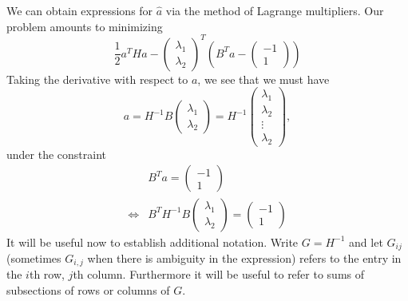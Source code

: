 \documentclass[11pt]{article}
\theoremstyle{definition}
\theoremstyle{remark}
\numberwithin{equation}{section}
\begin{document}
We can obtain expressions for $\hat{a}$ via the method of Lagrange multipliers. Our problem amounts to minimizing 
\[ \frac{1}{2} a^T H a - \begin{pmatrix} \lambda_1 \\ \lambda_2 \end{pmatrix}^T (B^Ta - \begin{pmatrix} -1 \\ 1 \end{pmatrix} )\] 
Taking the derivative with respect to $a$, we see that we must have 
\[ a = H^{-1} B \begin{pmatrix} \lambda_1 \\ \lambda_2 \end{pmatrix} = H^{-1} \begin{pmatrix} \lambda_1 \\ \lambda_2 \\ \vdots \\ \lambda_2 \end{pmatrix},\]
under the constraint 
\begin{align*}
&B^Ta = \begin{pmatrix} -1 \\ 1 \end{pmatrix} \\
\iff &B^T H^{-1} B \begin{pmatrix}\lambda_1 \\ \lambda_2 \end{pmatrix} = \begin{pmatrix} -1 \\ 1 \end{pmatrix}
\end{align*}\bigskip
It will be useful now to establish additional notation. Write $G = H^{-1}$ and let $G_{ij}$ (sometimes $G_{i,j}$ when there is ambiguity in the expression) refers to the entry in the $i$th row, $j$th column. Furthermore it will be useful to refer to sums of subsections of rows or columns of $G$. \\
\end{document}

